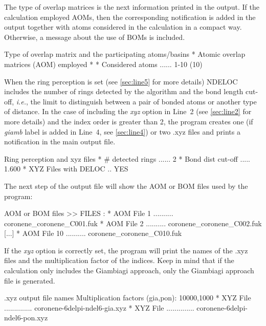 \documentclass[a4paper,11pt,openany]{memoir}
\newcommand\programa{\textsc{NDELOC}}
\begin{document}
The type of overlap matrices is the next information printed in the output. If the calculation employed \acfp{AOM}, then the corresponding notification is added in the output together with atoms considered in the calculation in a compact way. Otherwise, a message about the use of \acfp{BOM} is included.
\begin{recuadro}{Type of overlap matrix and the participating atoms/basins}
* Atomic overlap matrices (AOM) employed *
* Considered atoms ...... 1-10 (10)
\end{recuadro}
When the ring perception is set (see \autoref{sec:line5} for more details) \programa~ includes the number of rings detected by the algorithm and the bond length cut-off, \emph{i.e.}, the limit to distinguish between a pair of bonded atoms or another type of distance. In the case of including the \emph{xyz} option in Line~2 (see \autoref{sec:line2} for more details) and the index order is greater than 2, the program creates one (if \emph{giamb} label is added in Line~4, see \autoref{sec:line4}) or two .xyz files and prints a notification in the main output file.
\begin{recuadro}{Ring perception and xyz files}
* # detected rings ...... 2
* Bond dist cut-off ..... 1.600
* XYZ Files with DELOC .. YES
\end{recuadro}

The next step of the output file will show the \ac{AOM} or \ac{BOM} files used by the program:
\begin{recuadro}{\ac{AOM} or \ac{BOM} files}
>> FILES   :
* AOM File   1 .......... coronene_coronene_C001.fuk
* AOM File   2 .......... coronene_coronene_C002.fuk
[...]
* AOM File  10 .......... coronene_coronene_C010.fuk
\end{recuadro}

If the \emph{xyz} option is correctly set, the program will print the names of the .xyz files and the multiplication factor of the indices. Keep in mind that if the calculation only includes the Giambiagi approach, only the Giambiagi approach file is generated.
\begin{recuadro}{.xyz output file names}
Multiplication factors (gia,pon): 10000,1000
* XYZ File .............. coronene-6delpi-ndel6-gia.xyz
* XYZ File .............. coronene-6delpi-ndel6-pon.xyz
\end{recuadro}
\end{document}
